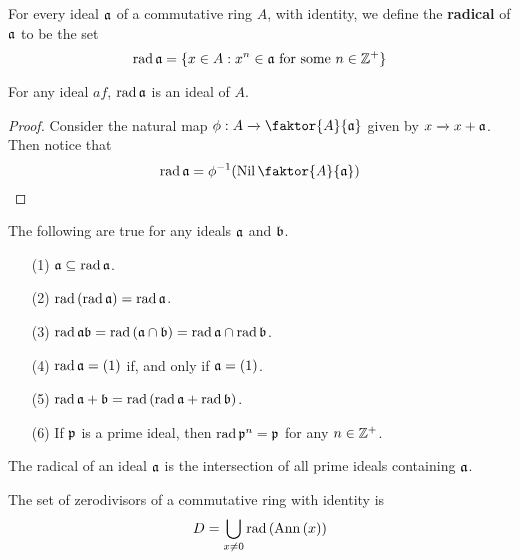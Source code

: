 \begin{definition}
    For every ideal $\af$ of a commutative ring $A$, with identity, we define
    the \textbf{radical} of $\af$ to be the set
    \begin{equation*}
        \rad{\af}=\{x \in A : x^n \in \af \text{ for some } n \in \Z^+\}
    \end{equation*}
\end{definition}

\begin{lemma}\label{1.9.10}
    For any ideal $af$, $\rad{\af}$ is an ideal of $A$.
\end{lemma}
\begin{proof}
    Consider the natural map $\phi:A \xrightarrow{} \faktor{A}{\af}$ given by $x
    \xrightarrow{} x+\af$. Then notice that
    \begin{equation*}
        \rad{\af}=\inv{\phi}(\Nil{\faktor{A}{\af}})
    \end{equation*}
\end{proof}

\begin{lemma}\label{1.9.11}
    The following are true for any ideals $\af$ and  $\bf$.
    \begin{enumerate}
        \item[(1)] $\af \subseteq \rad{\af}$.

        \item[(2)] $\rad{(\rad{\af})}=\rad{\af}$.

        \item[(3)] $\rad{\af\bf}=\rad{(\af \cap \bf)}=\rad{\af} \cap \rad{\bf}$.

        \item[(4)] $\rad{\af}=(1)$ if, and only if $\af=(1)$.

        \item[(5)] $\rad{\af+\bf}=\rad{(\rad{\af}+\rad{\bf})}$.

        \item[(6)] If $\pf$ is a prime ideal, then  $\rad{\pf^n}=\pf$ for any $n
            \in \Z^+$.
    \end{enumerate}
\end{lemma}

\begin{lemma}\label{1.9.12}
    The radical of an ideal $\af$ is the intersection of all prime ideals
    containing  $\af$.
\end{lemma}

\begin{lemma}\label{1.9.13}
    The set of zerodivisors of a commutative ring with identity is
    \begin{equation*}
        D=\bigcup_{x \neq 0}{\rad{(\Ann{(x)})}}
    \end{equation*}
\end{lemma}

